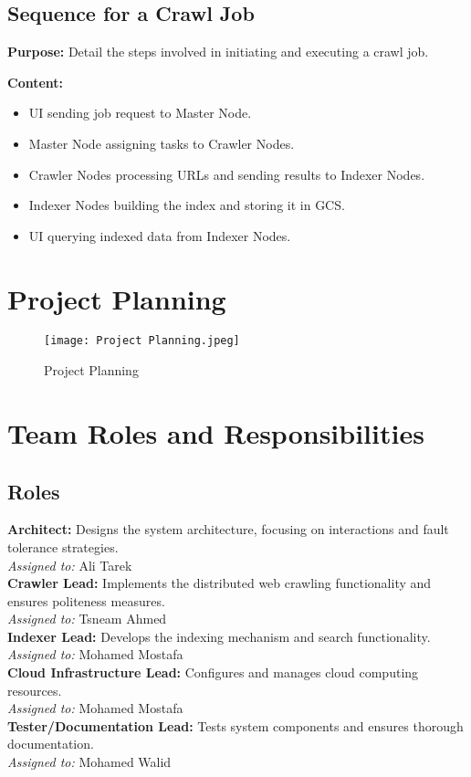 \documentclass[12pt,a4paper]{report}
\begin{document}
\subsection{Sequence for a Crawl Job}
\textbf{Purpose:} Detail the steps involved in initiating and executing a crawl job.

\textbf{Content:}
\begin{itemize}
\item UI sending job request to Master Node.
\item Master Node assigning tasks to Crawler Nodes.
\item Crawler Nodes processing URLs and sending results to Indexer Nodes.
\item Indexer Nodes building the index and storing it in GCS.
\item UI querying indexed data from Indexer Nodes.
\end{itemize}
\newpage
    \section{Project Planning}
\begin{figure}[htb!]
    \centering
    \texttt{[image: Project Planning.jpeg]}
    \caption{Project Planning}
    \label{fig:enter-label}
\end{figure}
\section{Team Roles and Responsibilities}

\subsection{Roles}

\textbf{Architect:} Designs the system architecture, focusing on interactions and fault tolerance strategies. \\
\hspace{10pt} \textit{Assigned to:} Ali Tarek\\
\textbf{Crawler Lead:} Implements the distributed web crawling functionality and ensures politeness measures. \\
\hspace{10pt} \textit{Assigned to:} Tsneam Ahmed\\
\textbf{Indexer Lead:} Develops the indexing mechanism and search functionality. \\
\hspace{10pt} \textit{Assigned to:} Mohamed Mostafa\\
\textbf{Cloud Infrastructure Lead:} Configures and manages cloud computing resources. \\
\hspace{10pt} \textit{Assigned to:} Mohamed Mostafa\\
\textbf{Tester/Documentation Lead:} Tests system components and ensures thorough documentation. \\
\hspace{10pt} \textit{Assigned to:} Mohamed Walid\\
\newpage
\end{document}
